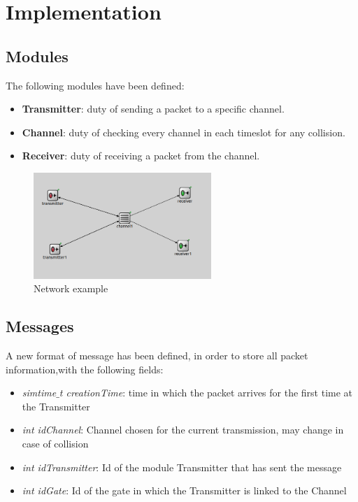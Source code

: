 \section{Implementation}
\subsection{Modules}
The following modules have been defined:
\begin{itemize}
	\item \textbf{Transmitter}: duty of sending a packet to a specific channel.%
	\item \textbf{Channel}: duty of checking every channel in each timeslot for any collision.%
	\item \textbf{Receiver}: duty of receiving a packet from the channel.
\end{itemize}

\begin{figure}[H]
	\centering
	\includegraphics[width=0.6\textwidth]{img/network.png}
	\caption{Network example}
	\label {img: network}
\end{figure}

\subsection{Messages}
A new format of message has been defined, in order to store all packet information,with the following fields:
\begin{itemize}
	\item \textit{simtime$\_$t creationTime}: time in which the packet arrives for the first time at the Transmitter
	\item \textit{int idChannel}: Channel chosen for the current transmission, may change in case of collision
	\item \textit{int idTransmitter}: Id of the module Transmitter that has sent the message
	\item \textit{int idGate}: Id of the gate in which the Transmitter is linked to the Channel
\end{itemize}


